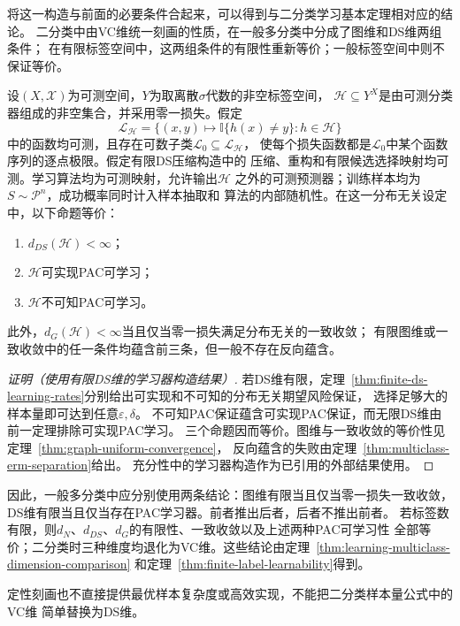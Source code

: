 将这一构造与前面的必要条件合起来，可以得到与二分类学习基本定理相对应的结论。
二分类中由VC维统一刻画的性质，在一般多分类中分成了图维和DS维两组条件；
在有限标签空间中，这两组条件的有限性重新等价；一般标签空间中则不保证等价。

\begin{theorem}[多分类学习基本定理]
\label{thm:ds-characterization}
设$(X,\mathcal X)$为可测空间，$Y$为取离散$\sigma$代数的非空标签空间，
$\mathcal H\subseteq Y^X$是由可测分类器组成的非空集合，并采用零一损失。假定
\[
 \mathcal L_{\mathcal H}
 =\{(x,y)\mapsto\mathbb I\{h(x)\neq y\}:h\in\mathcal H\}
\]
中的函数均可测，且存在可数子类$\mathcal L_0\subseteq\mathcal L_{\mathcal H}$，
使每个损失函数都是$\mathcal L_0$中某个函数序列的逐点极限。假定有限DS压缩构造中的
压缩、重构和有限候选选择映射均可测。学习算法均为可测映射，允许输出$\mathcal H$
之外的可测预测器；训练样本均为$S\sim\mathcal P^n$，成功概率同时计入样本抽取和
算法的内部随机性。在这一分布无关设定中，以下命题等价：
\begin{enumerate}
 \item $d_{DS}(\mathcal H)<\infty$；
 \item $\mathcal H$可实现PAC可学习；
 \item $\mathcal H$不可知PAC可学习。
\end{enumerate}
此外，$d_G(\mathcal H)<\infty$当且仅当零一损失满足分布无关的一致收敛；
有限图维或一致收敛中的任一条件均蕴含前三条，但一般不存在反向蕴含。
\end{theorem}

\begin{proof}[证明（使用有限DS维的学习器构造结果）]
若DS维有限，定理~\ref{thm:finite-ds-learning-rates}分别给出可实现和不可知的分布无关期望风险保证，
选择足够大的样本量即可达到任意$\varepsilon,\delta$。
不可知PAC保证蕴含可实现PAC保证，而无限DS维由前一定理排除可实现PAC学习。
三个命题因而等价。图维与一致收敛的等价性见定理~\ref{thm:graph-uniform-convergence}，
反向蕴含的失败由定理~\ref{thm:multiclass-erm-separation}给出。
充分性中的学习器构造作为已引用的外部结果使用。
\end{proof}

因此，一般多分类中应分别使用两条结论：图维有限当且仅当零一损失一致收敛，
DS维有限当且仅当存在PAC学习器。前者推出后者，后者不推出前者。
若标签数有限，则$d_N$、$d_{DS}$、$d_G$的有限性、一致收敛以及上述两种PAC可学习性
全部等价；二分类时三种维度均退化为VC维。这些结论由定理~\ref{thm:learning-multiclass-dimension-comparison}
和定理~\ref{thm:finite-label-learnability}得到。

定性刻画也不直接提供最优样本复杂度或高效实现，不能把二分类样本量公式中的VC维
简单替换为DS维。


